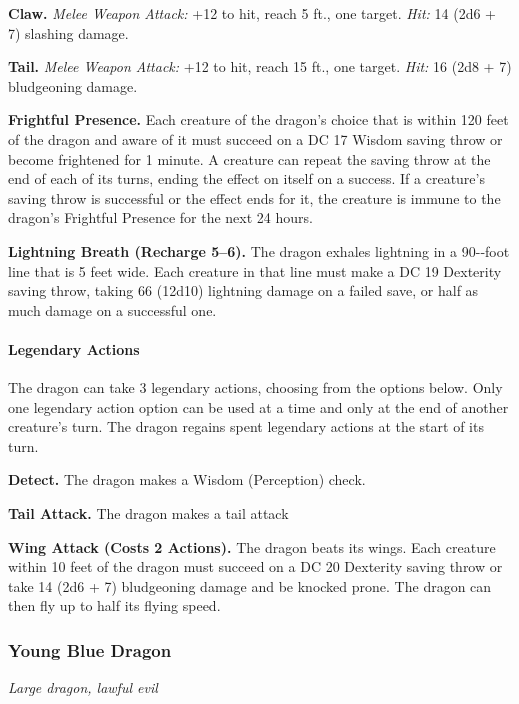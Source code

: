 \documentclass[
]{article}
\begin{document}
\textbf{Claw.} \emph{Melee Weapon Attack:} +12 to hit, reach 5 ft., one
target. \emph{Hit:} 14 (2d6 + 7) slashing damage.

\textbf{Tail.} \emph{Melee Weapon Attack:} +12 to hit, reach 15 ft., one
target. \emph{Hit:} 16 (2d8 + 7) bludgeoning damage.

\textbf{Frightful Presence.} Each creature of the dragon's choice that
is within 120 feet of the dragon and aware of it must succeed on a DC 17
Wisdom saving throw or become frightened for 1 minute. A creature can
repeat the saving throw at the end of each of its turns, ending the
effect on itself on a success. If a creature's saving throw is
successful or the effect ends for it, the creature is immune to the
dragon's Frightful Presence for the next 24 hours.

\textbf{Lightning Breath (Recharge 5--6).} The dragon exhales lightning
in a 90-­‐foot line that is 5 feet wide. Each creature in that line must
make a DC 19 Dexterity saving throw, taking 66 (12d10) lightning damage
on a failed save, or half as much damage on a successful one.

\hypertarget{legendary-actions-3}{%
\paragraph{Legendary Actions}\label{legendary-actions-3}}

The dragon can take 3 legendary actions, choosing from the options
below. Only one legendary action option can be used at a time and only
at the end of another creature's turn. The dragon regains spent
legendary actions at the start of its turn.

\textbf{Detect.} The dragon makes a Wisdom (Perception) check.

\textbf{Tail Attack.} The dragon makes a tail attack

\textbf{Wing Attack (Costs 2 Actions).} The dragon beats its wings. Each
creature within 10 feet of the dragon must succeed on a DC 20 Dexterity
saving throw or take 14 (2d6 + 7) bludgeoning damage and be knocked
prone. The dragon can then fly up to half its flying speed.

\hypertarget{young-blue-dragon}{%
\subsubsection{Young Blue Dragon}\label{young-blue-dragon}}

\emph{Large dragon, lawful evil}
\end{document}
